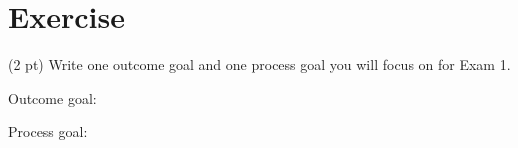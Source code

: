 %
%
%
%

\section{Exercise}

(2 pt) Write one outcome goal and one process goal you will focus on for Exam 1.

\vspace{0.25in}

\noindent{}Outcome goal:

\vspace{1in}

\noindent{}Process goal:

\vspace{1in}